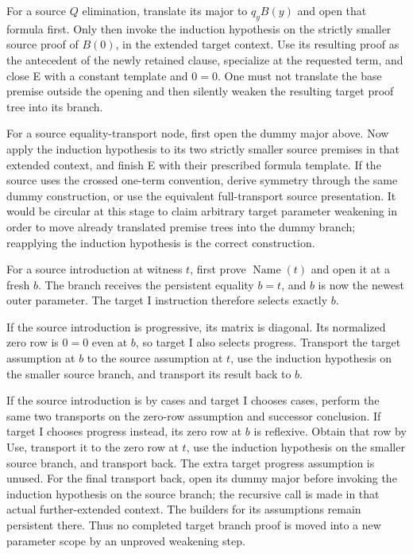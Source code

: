 \documentclass[11pt]{article}
\theoremstyle{definition}\newtheorem{definition}[theorem]{Definition}
\theoremstyle{remark}\newtheorem{remark}[theorem]{Remark}
\begin{document}
For a source $Q$ elimination, translate its major to $q_yB(y)$ and open
that formula first.  Only then invoke the induction hypothesis on the
strictly smaller source proof of $B(0)$, in the extended target context.
Use its resulting proof as the antecedent of the newly retained clause,
specialize at the requested term, and close E with a constant template
and $0=0$.  One must not translate the base premise outside the opening
and then silently weaken the resulting target proof tree into its branch.

For a source equality-transport node, first open the dummy major above.
Now apply the induction hypothesis to its two strictly smaller source
premises in that extended context, and finish E with their prescribed
formula template.  If the source uses the crossed one-term convention,
derive symmetry through the same dummy construction, or use the equivalent
full-transport source presentation.  It would be circular at this stage
to claim arbitrary target parameter weakening in order to move already
translated premise trees into the dummy branch; reapplying the induction
hypothesis is the correct construction.

For a source introduction at witness $t$, first prove
$\operatorname{Name}(t)$ and open it at a fresh $b$.  The branch receives
the persistent equality $b=t$, and $b$ is now the newest outer parameter.
The target I instruction therefore selects exactly $b$.

If the source introduction is progressive, its matrix is diagonal.
Its normalized zero row is $0=0$ even at $b$, so target I also selects
progress.  Transport the target assumption at $b$ to the source
assumption at $t$, use the induction hypothesis on the smaller source
branch, and transport its result back to $b$.

If the source introduction is by cases and target I chooses cases,
perform the same two transports on the zero-row assumption and successor
conclusion.  If target I chooses progress instead, its zero row at $b$
is reflexive.  Obtain that row by Use, transport it to the zero row at
$t$, use the induction hypothesis on the smaller source branch, and
transport back.  The extra target progress assumption is unused.
For the final transport back, open its dummy major before invoking the
induction hypothesis on the source branch; the recursive call is made in
that actual further-extended context. The builders for its assumptions
remain persistent there. Thus no completed target branch proof is moved
into a new parameter scope by an unproved weakening step.
\end{document}
